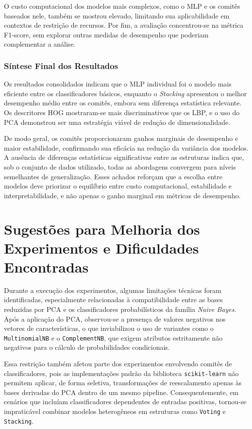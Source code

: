 \documentclass[12pt]{article}
\begin{document}
O custo computacional dos modelos mais complexos, como o MLP e os comitês baseados nele, também se mostrou elevado, limitando sua aplicabilidade em contextos de restrição de recursos. Por fim, a avaliação concentrou-se na métrica F1-score, sem explorar outras medidas de desempenho que poderiam complementar a análise.

\subsubsection{Síntese Final dos Resultados}

Os resultados consolidados indicam que o MLP individual foi o modelo mais eficiente entre os classificadores básicos, enquanto o \textit{Stacking} apresentou o melhor desempenho médio entre os comitês, embora sem diferença estatística relevante. Os descritores HOG mostraram-se mais discriminativos que os LBP, e o uso do PCA demonstrou ser uma estratégia viável de redução de dimensionalidade.

De modo geral, os comitês proporcionaram ganhos marginais de desempenho e maior estabilidade, confirmando sua eficácia na redução da variância dos modelos. A ausência de diferenças estatísticas significativas entre as estruturas indica que, sob o conjunto de dados utilizado, todas as abordagens convergem para níveis semelhantes de generalização. Esses achados reforçam que a escolha entre modelos deve priorizar o equilíbrio entre custo computacional, estabilidade e interpretabilidade, e não apenas o ganho marginal em métricas de desempenho.


\section{Sugestões para Melhoria dos Experimentos e Dificuldades Encontradas}

Durante a execução dos experimentos, algumas limitações técnicas foram identificadas, especialmente relacionadas à compatibilidade entre as bases reduzidas por PCA e os classificadores probabilísticos da família \textit{Naive Bayes}.  
Após a aplicação do PCA, observou-se a presença de valores negativos nos vetores de características, o que inviabilizou o uso de variantes como o \texttt{MultinomialNB} e o \texttt{ComplementNB}, que exigem atributos estritamente não negativos para o cálculo de probabilidades condicionais.  

Essa restrição também afetou parte dos experimentos envolvendo comitês de classificadores, pois as implementações padrão da biblioteca \texttt{scikit-learn} não permitem aplicar, de forma seletiva, transformações de reescalamento apenas às bases derivadas do PCA dentro de um mesmo pipeline. Consequentemente, em cenários que incluíam classificadores dependentes de entradas positivas, tornou-se impraticável combinar modelos heterogêneos em estruturas como \texttt{Voting} e \texttt{Stacking}.  
\end{document}
